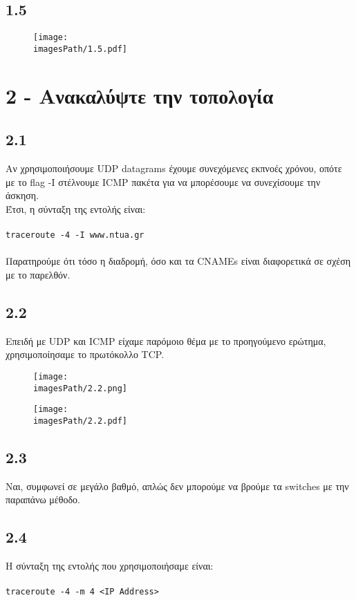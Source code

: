 		\subsection*{1.5} 		
			\begin{figure}[H]
				\texttt{[image: \\imagesPath/1.5.pdf]}
			\end{figure}
			
	\section*{2 - Ανακαλύψτε την τοπολογία}
		\subsection*{2.1}
			Αν χρησιμοποιήσουμε UDP datagrams έχουμε συνεχόμενες εκπνοές χρόνου, οπότε με το flag -I στέλνουμε ICMP πακέτα για να μπορέσουμε να συνεχίσουμε την άσκηση. \\
			Έτσι, η σύνταξη της εντολής είναι: \\~\\ 
			\verb|traceroute -4 -I www.ntua.gr| \\~\\
			Παρατηρούμε ότι τόσο η διαδρομή, όσο και τα CNAMEs είναι διαφορετικά σε σχέση με το παρελθόν.
			
		
		\subsection*{2.2}
			Επειδή με UDP και ICMP είχαμε παρόμοιο θέμα με το προηγούμενο ερώτημα, χρησιμοποίησαμε το πρωτόκολλο TCP.
			
			\begin{figure}[H]
				\texttt{[image: \\imagesPath/2.2.png]}
			\end{figure}
		
			\begin{figure}[H]
				\texttt{[image: \\imagesPath/2.2.pdf]}
			\end{figure}
			
		\subsection*{2.3}
			Ναι, συμφωνεί σε μεγάλο βαθμό, απλώς δεν μπορούμε να βρούμε τα switches με την παραπάνω μέθοδο.
		
		\subsection*{2.4}
			Η σύνταξη της εντολής που χρησιμοποιήσαμε είναι: \\~\\
			\verb|traceroute -4 -m 4 <IP Address>|
		
